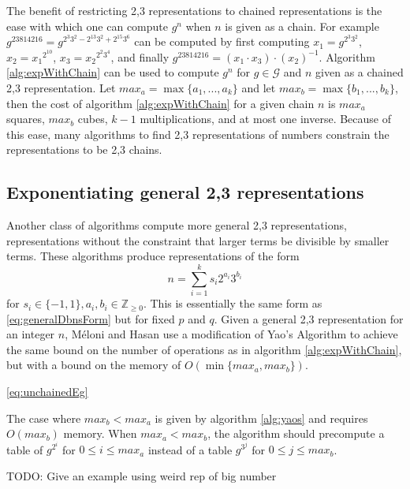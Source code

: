 \documentclass{ucalgthes1}
\theoremstyle{plain}
\theoremstyle{definition}
\newcommand{\ZZgez}{\mathbb{Z}_{\ge 0}}
\begin{document}
The benefit of restricting 2,3 representations to chained representations is the ease with which one can compute $g^n$ when $n$ is given as a chain.  For example $g^{23814216} = g^{2^3 3^2 - 2^{13} 3^2 + 2^{15} 3^6}$ can be computed by first computing $x_1 = g^{2^3 3^2}$, $x_2 = {x_1}^{2^{10}}$, $x_3 = {x_2}^{2^2 3^4}$, and finally $g^{23814216} = \left(x_1 \cdot x_3\right) \cdot \left(x_2\right)^{-1}$.  Algorithm \ref{alg:expWithChain} can be used to compute $g^n$ for $g \in \mathcal G$ and $n$ given as a chained 2,3 representation.  Let $max_a = \max \{a_1,...,a_k\}$ and let $max_b = \max \{b_1,...,b_k\}$, then the cost of algorithm \ref{alg:expWithChain} for a given chain $n$ is $max_a$ squares, $max_b$ cubes, $k-1$ multiplications, and at most one inverse. Because of this ease, many algorithms to find 2,3 representations of numbers constrain the representations to be 2,3 chains.


\bigbreak
\subsection{Exponentiating general 2,3 representations}

Another class of algorithms compute more general 2,3 representations, representations without the constraint that larger terms be divisible by smaller terms.  These algorithms produce representations of the form
\[
	n = \sum_{i=1}^k s_i 2^{a_i} 3^{b_i}
\]
for $s_i \in \{-1, 1\}, a_i, b_i \in \ZZgez$.  This is essentially the same form as \eqref{eq:generalDbnsForm} but for fixed $p$ and $q$.  Given a general 2,3 representation for an integer $n$, M\'{e}loni and Hasan use a modification of Yao's Algorithm \cite[Section 3.2]{Meloni2009} to achieve the same bound on the number of operations as in algorithm \ref{alg:expWithChain}, but with a bound on the memory of $O(\min \{max_a, max_b\})$.

\eqref{eq:unchainedEg}


The case where $max_b < max_a$ is given by algorithm \ref{alg:yaos} and requires $O(max_b)$ memory.  When $max_a < max_b$, the algorithm should precompute a table of $g^{2^i}$ for $0 \le i \le max_a$ instead of a table $g^{3^j}$ for $0 \le j \le max_b$.

TODO: Give an example using weird rep of big number
\end{document}
